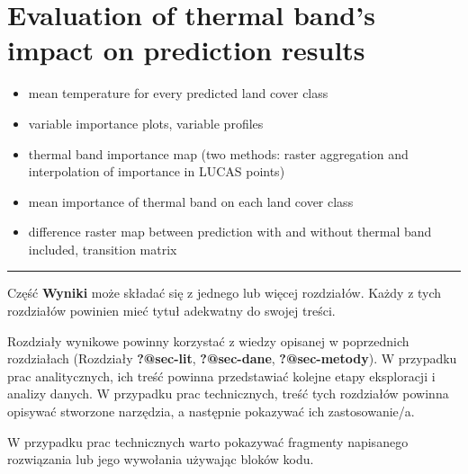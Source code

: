 \documentclass{amuthesis}
\begin{document}

\hypertarget{sec-results-therm}{%
\chapter{Evaluation of thermal band's impact on prediction
results}\label{sec-results-therm}}

\begin{itemize}
\item
  mean temperature for every predicted land cover class
\item
  variable importance plots, variable profiles
\item
  thermal band importance map (two methods: raster aggregation and
  interpolation of importance in LUCAS points)
\item
  mean importance of thermal band on each land cover class
\item
  difference raster map between prediction with and without thermal band
  included, transition matrix
\end{itemize}

\begin{center}\rule{0.5\linewidth}{0.5pt}\end{center}

Część \textbf{Wyniki} może składać się z jednego lub więcej rozdziałów.
Każdy z tych rozdziałów powinien mieć tytuł adekwatny do swojej treści.

Rozdziały wynikowe powinny korzystać z wiedzy opisanej w poprzednich
rozdziałach (Rozdziały \textbf{?@sec-lit}, \textbf{?@sec-dane},
\textbf{?@sec-metody}). W przypadku prac analitycznych, ich treść
powinna przedstawiać kolejne etapy eksploracji i analizy danych. W
przypadku prac technicznych, treść tych rozdziałów powinna opisywać
stworzone narzędzia, a następnie pokazywać ich zastosowanie/a.

W przypadku prac technicznych warto pokazywać fragmenty napisanego
rozwiązania lub jego wywołania używając bloków kodu.

\begin{Shaded}
\begin{Highlighting}[]
\OtherTok{=} 
  \NormalTok{)}
\NormalTok{\}}
\NormalTok{(}\NormalTok{)}
\end{Highlighting}
\end{Shaded}
\end{document}
